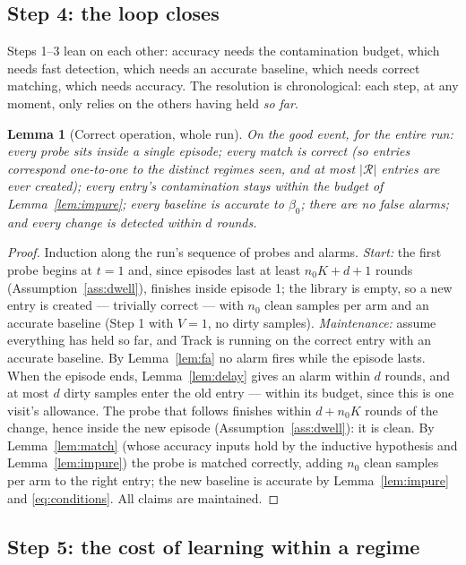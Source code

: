 \documentclass[11pt]{article}
\newtheorem{lemma}{Lemma}
\newcommand{\Rcal}{\mathcal R}
\begin{document}
\subsection{Step 4: the loop closes}

Steps 1--3 lean on each other: accuracy needs the contamination budget, which needs fast detection, which needs an accurate baseline, which needs correct matching, which needs accuracy. The resolution is chronological: each step, at any moment, only relies on the others having held \emph{so far}.

\begin{lemma}[Correct operation, whole run]
\label{lem:induction}
On the good event, for the entire run: every probe sits inside a single episode; every match is correct (so entries correspond one-to-one to the distinct regimes seen, and at most $|\Rcal|$ entries are ever created); every entry's contamination stays within the budget of Lemma~\ref{lem:impure}; every baseline is accurate to $\beta_0$; there are no false alarms; and every change is detected within $d$ rounds.
\end{lemma}

\begin{proof}
Induction along the run's sequence of probes and alarms. \emph{Start:} the first probe begins at $t=1$ and, since episodes last at least $n_0K+d+1$ rounds (Assumption~\ref{ass:dwell}), finishes inside episode 1; the library is empty, so a new entry is created --- trivially correct --- with $n_0$ clean samples per arm and an accurate baseline (Step 1 with $V=1$, no dirty samples). \emph{Maintenance:} assume everything has held so far, and Track is running on the correct entry with an accurate baseline. By Lemma~\ref{lem:fa} no alarm fires while the episode lasts. When the episode ends, Lemma~\ref{lem:delay} gives an alarm within $d$ rounds, and at most $d$ dirty samples enter the old entry --- within its budget, since this is one visit's allowance. The probe that follows finishes within $d+n_0K$ rounds of the change, hence inside the new episode (Assumption~\ref{ass:dwell}): it is clean. By Lemma~\ref{lem:match} (whose accuracy inputs hold by the inductive hypothesis and Lemma~\ref{lem:impure}) the probe is matched correctly, adding $n_0$ clean samples per arm to the right entry; the new baseline is accurate by Lemma~\ref{lem:impure} and \eqref{eq:conditions}. All claims are maintained.
\end{proof}

\subsection{Step 5: the cost of learning within a regime}
\end{document}
